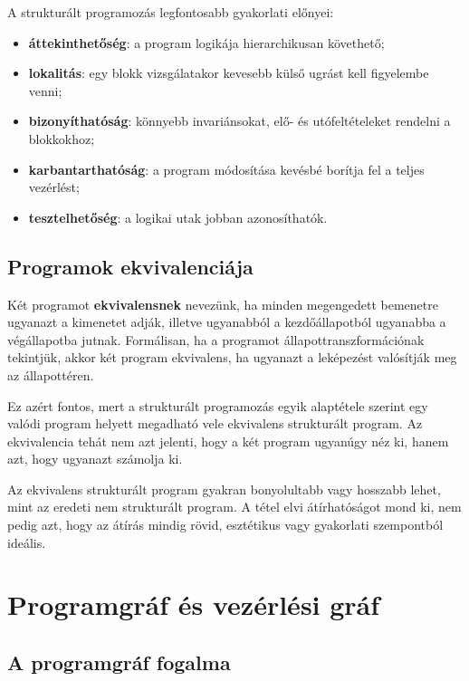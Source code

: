 A strukturált programozás legfontosabb gyakorlati előnyei:

\begin{itemize}
  \item \textbf{áttekinthetőség}: a program logikája hierarchikusan követhető;
  \item \textbf{lokalitás}: egy blokk vizsgálatakor kevesebb külső ugrást kell figyelembe venni;
  \item \textbf{bizonyíthatóság}: könnyebb invariánsokat, elő- és utófeltételeket rendelni a blokkokhoz;
  \item \textbf{karbantarthatóság}: a program módosítása kevésbé borítja fel a teljes vezérlést;
  \item \textbf{tesztelhetőség}: a logikai utak jobban azonosíthatók.
\end{itemize}

\subsection{Programok ekvivalenciája}

Két programot \textbf{ekvivalensnek} nevezünk, ha minden megengedett bemenetre ugyanazt a kimenetet adják, illetve ugyanabból a kezdőállapotból ugyanabba a végállapotba jutnak. Formálisan, ha a programot állapottranszformációnak tekintjük, akkor két program ekvivalens, ha ugyanazt a leképezést valósítják meg az állapottéren.

Ez azért fontos, mert a strukturált programozás egyik alaptétele szerint egy valódi program helyett megadható vele ekvivalens strukturált program. Az ekvivalencia tehát nem azt jelenti, hogy a két program ugyanúgy néz ki, hanem azt, hogy ugyanazt számolja ki.

\begin{warningbox}
Az ekvivalens strukturált program gyakran bonyolultabb vagy hosszabb lehet, mint az eredeti nem strukturált program. A tétel elvi átírhatóságot mond ki, nem pedig azt, hogy az átírás mindig rövid, esztétikus vagy gyakorlati szempontból ideális.
\end{warningbox}

\section{Programgráf és vezérlési gráf}

\subsection{A programgráf fogalma}

